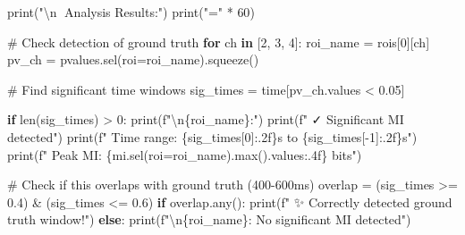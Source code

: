 \documentclass[
  11pt,
  letterpaper,
  oneside,
  openany]{book}
\newenvironment{Shaded}{\begin{snugshade}}{\end{snugshade}}
\newcommand{\BuiltInTok}[1]{\textcolor[rgb]{0.00,0.23,0.31}{#1}}
\newcommand{\CharTok}[1]{\textcolor[rgb]{0.13,0.47,0.30}{#1}}
\newcommand{\CommentTok}[1]{\textcolor[rgb]{0.37,0.37,0.37}{#1}}
\newcommand{\ControlFlowTok}[1]{\textcolor[rgb]{0.00,0.23,0.31}{\textbf{#1}}}
\newcommand{\DecValTok}[1]{\textcolor[rgb]{0.68,0.00,0.00}{#1}}
\newcommand{\FloatTok}[1]{\textcolor[rgb]{0.68,0.00,0.00}{#1}}
\newcommand{\KeywordTok}[1]{\textcolor[rgb]{0.00,0.23,0.31}{\textbf{#1}}}
\newcommand{\NormalTok}[1]{\textcolor[rgb]{0.00,0.23,0.31}{#1}}
\newcommand{\OperatorTok}[1]{\textcolor[rgb]{0.37,0.37,0.37}{#1}}
\newcommand{\SpecialCharTok}[1]{\textcolor[rgb]{0.37,0.37,0.37}{#1}}
\newcommand{\SpecialStringTok}[1]{\textcolor[rgb]{0.13,0.47,0.30}{#1}}
\newcommand{\StringTok}[1]{\textcolor[rgb]{0.13,0.47,0.30}{#1}}
\begin{document}
\begin{Shaded}
\begin{Highlighting}[]
\BuiltInTok{print}\NormalTok{(}\StringTok{"}\CharTok{\textbackslash{}n}\StringTok{🎯 Analysis Results:"}\NormalTok{)}
\BuiltInTok{print}\NormalTok{(}\StringTok{"="} \OperatorTok{*} \DecValTok{60}\NormalTok{)}

\CommentTok{\# Check detection of ground truth}
\ControlFlowTok{for}\NormalTok{ ch }\KeywordTok{in}\NormalTok{ [}\DecValTok{2}\NormalTok{, }\DecValTok{3}\NormalTok{, }\DecValTok{4}\NormalTok{]:}
\NormalTok{    roi\_name }\OperatorTok{=}\NormalTok{ rois[}\DecValTok{0}\NormalTok{][ch]}
\NormalTok{    pv\_ch }\OperatorTok{=}\NormalTok{ pvalues.sel(roi}\OperatorTok{=}\NormalTok{roi\_name).squeeze()}
    
    \CommentTok{\# Find significant time windows}
\NormalTok{    sig\_times }\OperatorTok{=}\NormalTok{ time[pv\_ch.values }\OperatorTok{\textless{}} \FloatTok{0.05}\NormalTok{]}
    
    \ControlFlowTok{if} \BuiltInTok{len}\NormalTok{(sig\_times) }\OperatorTok{\textgreater{}} \DecValTok{0}\NormalTok{:}
        \BuiltInTok{print}\NormalTok{(}\SpecialStringTok{f"}\CharTok{\textbackslash{}n}\SpecialCharTok{\{}\NormalTok{roi\_name}\SpecialCharTok{\}}\SpecialStringTok{:"}\NormalTok{)}
        \BuiltInTok{print}\NormalTok{(}\SpecialStringTok{f"  ✓ Significant MI detected"}\NormalTok{)}
        \BuiltInTok{print}\NormalTok{(}\SpecialStringTok{f"  Time range: }\SpecialCharTok{\{}\NormalTok{sig\_times[}\DecValTok{0}\NormalTok{]}\SpecialCharTok{:.2f\}}\SpecialStringTok{s to }\SpecialCharTok{\{}\NormalTok{sig\_times[}\OperatorTok{{-}}\DecValTok{1}\NormalTok{]}\SpecialCharTok{:.2f\}}\SpecialStringTok{s"}\NormalTok{)}
        \BuiltInTok{print}\NormalTok{(}\SpecialStringTok{f"  Peak MI: }\SpecialCharTok{\{}\NormalTok{mi}\SpecialCharTok{.}\NormalTok{sel(roi}\OperatorTok{=}\NormalTok{roi\_name)}\SpecialCharTok{.}\BuiltInTok{max}\NormalTok{()}\SpecialCharTok{.}\NormalTok{values}\SpecialCharTok{:.4f\}}\SpecialStringTok{ bits"}\NormalTok{)}
        
        \CommentTok{\# Check if this overlaps with ground truth (400{-}600ms)}
\NormalTok{        overlap }\OperatorTok{=}\NormalTok{ (sig\_times }\OperatorTok{\textgreater{}=} \FloatTok{0.4}\NormalTok{) }\OperatorTok{\&}\NormalTok{ (sig\_times }\OperatorTok{\textless{}=} \FloatTok{0.6}\NormalTok{)}
        \ControlFlowTok{if}\NormalTok{ overlap.}\BuiltInTok{any}\NormalTok{():}
            \BuiltInTok{print}\NormalTok{(}\SpecialStringTok{f"  ✨ Correctly detected ground truth window!"}\NormalTok{)}
    \ControlFlowTok{else}\NormalTok{:}
        \BuiltInTok{print}\NormalTok{(}\SpecialStringTok{f"}\CharTok{\textbackslash{}n}\SpecialCharTok{\{}\NormalTok{roi\_name}\SpecialCharTok{\}}\SpecialStringTok{: No significant MI detected"}\NormalTok{)}


\end{Highlighting}
\end{Shaded}
\end{document}
